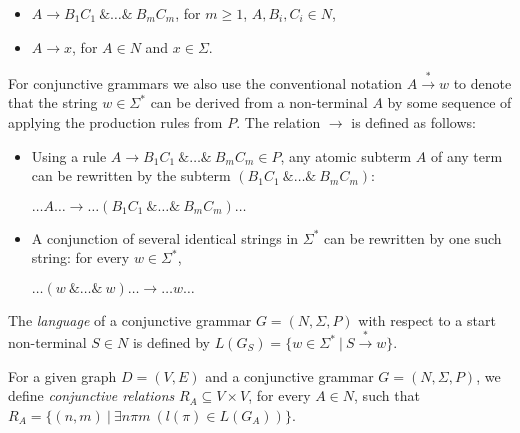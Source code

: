 \begin{itemize}
	\item $A \rightarrow B_1 C_1~\& \ldots \&~B_m C_m$, for $m \geq 1$, $A,B_i,C_i \in N$,
	\item $A \rightarrow x$, for $A \in N$ and $x \in \Sigma$.   
\end{itemize}

For conjunctive grammars we also use the conventional notation $A \xrightarrow{*} w$ to denote that the string $w \in \Sigma^*$ can be derived from a non-terminal $A$ by some sequence of applying the production rules from $P$. The relation $\rightarrow$ is defined as follows:
\begin{itemize}
	\item Using a rule $A \rightarrow B_1 C_1~\& \ldots \&~B_m C_m \in P$, any atomic subterm $A$ of any term can be rewritten by the subterm $(B_1 C_1 ~\& \ldots \&~ B_m C_m)$:
	\begin{center}
		$\ldots A \ldots \rightarrow \ldots (B_1 C_1~\& \ldots \&~B_m C_m) \ldots$
	\end{center}
	\item A conjunction of several identical strings in $\Sigma^*$ can be rewritten by one such string: for every $w \in \Sigma^*$,
	\begin{center}
		$\ldots (w~\& \ldots \&~w) \ldots \rightarrow \ldots w \ldots$
	\end{center}
	
\end{itemize}

The \textit{language} of a conjunctive grammar $G = (N,\Sigma,P)$ with respect to a start non-terminal $S \in N$ is defined by $L(G_S) = \{w \in \Sigma^*~|~S \xrightarrow{*} w\}$.

For a given graph $D = (V, E)$ and a conjunctive grammar $G = (N, \Sigma, P)$, we define \textit{conjunctive relations} $R_A \subseteq V \times V$, for every $A \in N$, such that $R_A = \{(n,m)~|~\exists n \pi m~(l(\pi) \in L(G_A))\}$.
